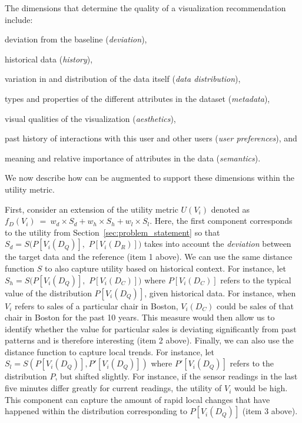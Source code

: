 {The dimensions that determine the quality of a visualization recommendation
include:
  \begin{inparaenum}
  \item deviation from the baseline ({\it deviation}),
  \item historical data ({\em history}),
  \item variation in and distribution of the data itself ({\it data distribution}),
  \item types and properties of the different attributes in the dataset ({\it metadata}), 
\item visual qualities of the visualization ({\it aesthetics}),  
\item past history of interactions with this user and other users ({\it user preferences}), and 
\item meaning and relative importance of attributes in the data ({\it semantics}). 
\end{inparaenum}
We now describe how \SeeDB can be augmented to support these dimensions
within the utility metric.

First, consider an extension of the utility metric  
$U (V_i)$ denoted as $f_D (V_i)\ =\ w_d \times S_d + w_h \times S_h + w_l  \times S_l$.
Here, the first component corresponds to the utility  
from Section~\ref{sec:problem_statement}
so that $S_d = S ( P[V_i (D_Q)],$ $P[V_i (D_R)] )$ 
takes into account the {\em deviation} between the target data and the reference (item 1 above).
We can use the same distance function $S$ to also capture utility based on historical context. 
For instance, let $S_h = S ( P[V_i (D_Q)], $ $P[V_i (D_C)] )$ where
$P[V_i (D_C)]$ refers to the typical value of the distribution 
$P[V_i (D_Q)]$, given historical data.
For instance, when $V_i$ refers to sales of a particular chair in 
Boston, $V_i(D_C)$ could be sales of that chair in Boston for the past 10 years.
This measure would then allow us to identify whether the value for particular sales is 
deviating significantly from past patterns and is therefore interesting (item 2 above).
Finally, we can also use the distance function to capture local trends.
For instance, let $S_l = S ( P[V_i (D_Q)], P'[V_i (D_Q)] )$ where
$P'[V_i (D_Q)]$ refers to the distribution $P$, but shifted slightly.
For instance, if the sensor readings in the last five minutes differ greatly
for current readings, the utility of $V_i$ would be high.
This component can capture
the amount of rapid local changes that have happened
within the distribution corresponding to $P[V_i (D_Q)]$ (item 3 above).


}
